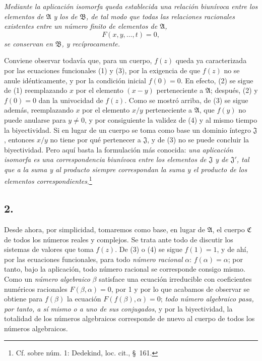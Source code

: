 \emph{Mediante la aplicación isomorfa queda establecida una relación biunívoca entre los elementos de $\mathfrak A$ y los de $\mathfrak B$, de tal modo que todas las relaciones racionales existentes entre un número finito de elementos de $\mathfrak A$,
\[
F(x,y,\ldots,t)=0,
\]
se conservan en $\mathfrak B$, y recíprocamente.}

Conviene observar todavía que, para un cuerpo, $f(z)$ queda ya caracterizada por las ecuaciones funcionales (1) y (3), por la exigencia de que $f(z)$ no se anule idénticamente, y por la condición inicial $f(0)=0$. En efecto, (2) se sigue de (1) reemplazando $x$ por el elemento $(x-y)$ perteneciente a $\mathfrak A$; después, (2) y $f(0)=0$ dan la univocidad de $f(z)$. Como se mostró arriba, de (3) se sigue además, reemplazando $x$ por el elemento $x/y$ perteneciente a $\mathfrak A$, que $f(y)$ no puede anularse para $y\ne0$, y por consiguiente la validez de (4) y al mismo tiempo la biyectividad. Si en lugar de un cuerpo se toma como base un dominio íntegro $\mathfrak J$, entonces $x/y$ no tiene por qué pertenecer a $\mathfrak J$, y de (3) no se puede concluir la biyectividad. Pero aquí basta la formulación más conocida: \emph{una aplicación isomorfa es una correspondencia biunívoca entre los elementos de $\mathfrak J$ y de $\mathfrak J'$, tal que a la suma y al producto siempre correspondan la suma y el producto de los elementos correspondientes}.\footnote{Cf. sobre núm. 1: Dedekind, loc. cit., \S\ 161.}

\subsection*{2.}

Desde ahora, por simplicidad, tomaremos como base, en lugar de $\mathfrak A$, el cuerpo $\mathfrak C$ de todos los números reales y complejos. Se trata ante todo de discutir los sistemas de valores que toma $f(z)$. De (3) o (4) se sigue $f(1)=1$, y de ahí, por las ecuaciones funcionales, para todo \emph{número racional} $\alpha$: $f(\alpha)=\alpha$; por tanto, bajo la aplicación, todo número racional se corresponde consigo mismo. Como un \emph{número algebraico} $\beta$ satisface una ecuación irreducible con coeficientes numéricos racionales $F(\beta,\alpha)=0$, por 1 y por lo que acabamos de observar se obtiene para $f(\beta)$ la ecuación $F(f(\beta),\alpha)=0$; \emph{todo número algebraico pasa, por tanto, a sí mismo o a uno de sus conjugados}, y por la biyectividad, la totalidad de los números algebraicos corresponde de nuevo al cuerpo de todos los números algebraicos.

